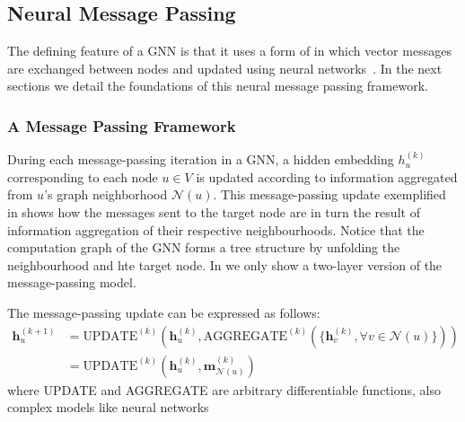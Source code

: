 \subsection{Neural Message Passing}
The defining feature of a GNN is that it uses a form of  in which vector messages are exchanged between nodes and updated using neural networks~\cite{Gilmer2017neuralMessagePassing}. In the next sections we detail the foundations of this neural message passing framework.

\subsubsection{A Message Passing Framework}
During each message-passing iteration in a GNN, a hidden embedding $h_u^{(k)}$ corresponding to each node $u\in V$ is updated according to information aggregated
from $u$’s graph neighborhood $\mathcal{N} (u)$. This message-passing update exemplified in  shows how the messages sent to the target node are in turn the result of information aggregation of their respective neighbourhoods. Notice that the computation graph of the GNN forms a tree structure by unfolding the neighbourhood and hte target node. In  we only show a two-layer version of the message-passing model.



The message-passing update can be expressed as follows:
\begin{align*}
    \mathbf{h}_u^{(k+1)} &= \text{UPDATE}^{(k)}\left(\mathbf{h}_u^{(k)}, \text{AGGREGATE}^{(k)}(\{\mathbf{h}_v^{(k)}, \forall v \in \mathcal{N}(u)\})\right) \\
    &= \text{UPDATE}^{(k)}\left(\mathbf{h}_u^{(k)}, \mathbf{m}_{\mathcal{N}(u)}^{(k)}\right)
\end{align*}
where UPDATE and AGGREGATE are arbitrary differentiable functions, also complex models like neural networks


